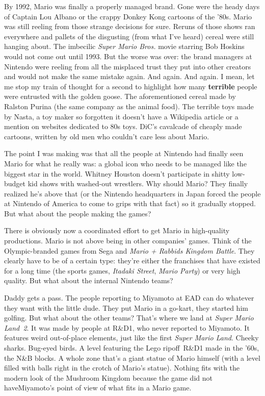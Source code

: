 \documentclass{book}
\begin{document}
By 1992, Mario was finally a properly managed brand. Gone were the heady days of Captain Lou Albano or the crappy Donkey Kong cartoons of the ’80s. Mario was still reeling from those strange decisions for sure. Reruns of those shows ran everywhere and pallets of the disgusting (from what I’ve heard) cereal were still hanging about. The imbecilic \emph{Super Mario Bros.} movie starring Bob Hoskins would not come out until 1993. But the worse was over: the brand managers at Nintendo were reeling from all the misplaced trust they put into other creators and would not make the same mistake again. And again. And again. I mean, let me stop my train of thought for a second to highlight how many \textbf{terrible} people were entrusted with the golden goose. The aforementioned cereal made by Ralston Purina (the same company as the animal food). The terrible toys made by Nasta, a toy maker so forgotten it doesn’t have a Wikipedia article or a mention on websites dedicated to 80s toys. DiC’s cavalcade of cheaply made cartoons, written by old men who couldn’t care less about Mario.\par
The point I was making was that all the people at Nintendo had finally seen Mario for what he really was: a global icon who needs to be managed like the biggest star in the world. Whitney Houston doesn’t participate in shitty low-budget kid shows with washed-out wrestlers. Why should Mario? They finally realized he’s above that (or the Nintendo headquarters in Japan forced the people at Nintendo of America to come to grips with that fact) so it gradually stopped. But what about the people making the games?\par
There is obviously now a coordinated effort to get Mario in high-quality productions. Mario is not above being in other companies’ games. Think of the Olympic-branded games from Sega and \emph{Mario + Rabbids Kingdom Battle}. They clearly have to be of a certain type: they’re either the franchises that have existed for a long time (the sports games, \emph{Itadaki Street}, \emph{Mario Party}) or very high quality. But what about the internal Nintendo teams?\par
Daddy gets a pass. The people reporting to Miyamoto at EAD can do whatever they want with the little dude. They put Mario in a go-kart, they started him golfing. But what about the other teams? That’s where we land at \emph{Super Mario Land~2}. It was made by people at R\&D1, who never reported to Miyamoto. It features weird out-of-place elements, just like the first \emph{Super Mario Land}. Cheeky sharks. Bug-eyed birds. A level featuring the Lego ripoff~R\&D1 made in the ’60s, the N\&B blocks. A whole zone that’s a giant statue of Mario himself (with a level filled with balls right in the crotch of Mario’s statue). Nothing fits with the modern look of the Mushroom Kingdom because the game did not haveMiyamoto’s point of view of what fits in a Mario game.\par
\end{document}
